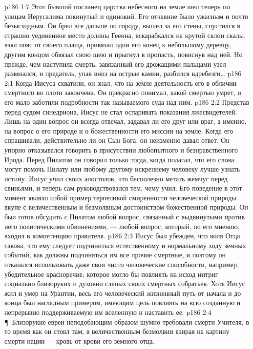 \vs p186 1:7 Этот бывший посланец царства небесного на земле шел теперь по улицам Иерусалима покинутый и одинокий. Его отчаяние было ужасным и почти безысходным. Он брел все дальше по городу, вышел за его стены, спустился в страшно уединенное место долины Геенна, вскарабкался на крутой склон скалы, взял пояс от своего плаща, привязал один его конец к небольшому деревцу, другим концом обвязал свою шею и прыгнул в пропасть, повиснув над ней. Но прежде, чем наступила смерть, завязанный его дрожащими пальцами узел развязался, и предатель, упав вниз на острые камни, разбился вдребезги\ldots
{}
\vs p186 2:1 Когда Иисуса схватили, он знал, что на земле деятельность его в обличии смертного во плоти закончена. Он прекрасно понимал, какой смертью умрет, и его мало заботили подробности так называемого суда над ним.
\vs p186 2:2 Представ перед судом синедриона, Иисус не стал оспаривать показания лжесвидетелей. Лишь на один вопрос он всегда отвечал, задавал ли его друг или враг, а именно, на вопрос о его природе и о божественности его миссии на земле. Когда его спрашивали, действительно ли он Сын Бога, он неизменно давал ответ. Он упорно отказывался говорить в присутствии любопытного и безнравственного Ирода. Перед Пилатом он говорил только тогда, когда полагал, что его слова могут помочь Пилату или любому другому искреннему человеку лучше узнать истину. Иисус учил своих апостолов, что бесполезно метать жемчуг перед свиньями, и теперь сам руководствовался тем, чему учил. Его поведение в этот момент являло собой пример терпеливой смиренности человеческой природы вкупе с величественным и безмолвным достоинством божественной природы. Он был готов обсудить с Пилатом любой вопрос, связанный с выдвинутыми против него политическими обвинениями, --- любой вопрос, который, по его мнению, входил в компетенцию правителя.
\vs p186 2:3 Иисус был убежден, что воля Отца такова, что ему следует подчиниться естественному и нормальному ходу земных событий, как должны подчиняться им все прочие смертные, и поэтому он отказался использовать даже свои чисто человеческие способности, например, убедительное красноречие, которое могло бы повлиять на исход интриг социально близоруких и духовно слепых своих смертных собратьев. Хотя Иисус жил и умер на Урантии, весь его человеческий жизненный путь от начала и до конца был наглядным примером, имеющим цель повлиять на всю созданную и непрерывно поддерживаемую им вселенную и наставить ее.
\vs p186 2:4 \P\ Близорукие евреи неподобающим образом шумно требовали смерти Учителя, в то время как он стоял там, в величественным безмолвии взирая на картину смерти нации --- кровь от крови его земного отца.
